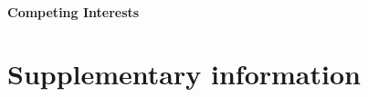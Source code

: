 \documentclass{article}
\begin{document}
\paragraph{Competing Interests}
  



\section*{Supplementary information}

\appendix
\renewcommand{\theequation}{S\arabic{equation}}
\renewcommand{\thefigure}{S\arabic{figure}}
\renewcommand{\thesection}{S\arabic{section}}
\renewcommand{\thetable}{S\arabic{table}}
\setcounter{table}{0}
\setcounter{figure}{0}
\end{document}
